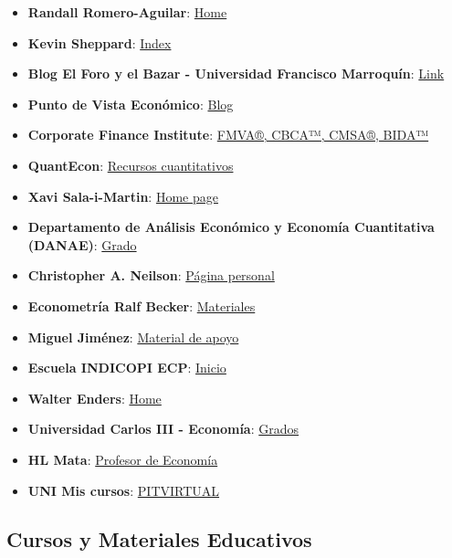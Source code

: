 \documentclass[
  jou,
  floatsintext,
  longtable,
  a4paper,
  nolmodern,
  notxfonts,
  notimes,
  colorlinks=true,linkcolor=blue,citecolor=blue,urlcolor=blue]{apa7}
\providecommand{\tightlist}{%
  \setlength{\itemsep}{0pt}\setlength{\parskip}{0pt}}
\begin{document}
\begin{itemize}
\tightlist
\item
  \textbf{Randall Romero-Aguilar}:
  \href{https://randall-romero.com/}{Home}
\item
  \textbf{Kevin Sheppard}: \href{https://www.kevinsheppard.com/}{Index}
\item
  \textbf{Blog El Foro y el Bazar - Universidad Francisco Marroquín}:
  \href{https://bazar.ufm.edu/}{Link}
\item
  \textbf{Punto de Vista Económico}:
  \href{https://puntodevistaeconomico.com/}{Blog}
\item
  \textbf{Corporate Finance Institute}:
  \href{https://corporatefinanceinstitute.com/}{FMVA®, CBCA™, CMSA®,
  BIDA™}
\item
  \textbf{QuantEcon}: \href{https://quantecon.org/}{Recursos
  cuantitativos}
\item
  \textbf{Xavi Sala-i-Martin}: \href{https://www.salaimartin.com/}{Home
  page}
\item
  \textbf{Departamento de Análisis Económico y Economía Cuantitativa
  (DANAE)}:
  \href{https://www.ucm.es/fundamentos-analisis-economico2/grado}{Grado}
\item
  \textbf{Christopher A. Neilson}:
  \href{https://christopherneilson.github.io/}{Página personal}
\item
  \textbf{Econometría Ralf Becker}:
  \href{https://datasquad.github.io/ralffbecker/index.html}{Materiales}
\item
  \textbf{Miguel Jiménez}:
  \href{https://migueljimenezg.github.io/cursos/index.html}{Material de
  apoyo}
\item
  \textbf{Escuela INDICOPI ECP}:
  \href{https://www.escuela-indecopi.edu.pe/}{Inicio}
\item
  \textbf{Walter Enders}: \href{https://wenders.people.ua.edu/}{Home}
\item
  \textbf{Universidad Carlos III - Economía}:
  \href{https://economia.uc3m.es/grados/}{Grados}
\item
  \textbf{HL Mata}:
  \href{http://webdelprofesor.ula.ve/economia/hmata/}{Profesor de
  Economía}
\item
  \textbf{UNI Mis cursos}:
  \href{https://pit-virtual.uni.edu.pe/my/courses.php}{PITVIRTUAL}
\end{itemize}

\subsection{Cursos y Materiales
Educativos}\label{cursos-y-materiales-educativos}
\end{document}
